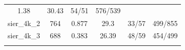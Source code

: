\documentclass[]{article}
\begin{document}
\begin{longtable}[]{@{}cccccc@{}}
\begin{minipage}[t]{0.11\columnwidth}
1.38\strut
\end{minipage} & \begin{minipage}[t]{0.13\columnwidth}\centering\strut
30.43\strut
\end{minipage} & \begin{minipage}[t]{0.18\columnwidth}\centering\strut
54/51\strut
\end{minipage} & \begin{minipage}[t]{0.22\columnwidth}\centering\strut
576/539\strut
\end{minipage}\tabularnewline
\begin{minipage}[t]{0.11\columnwidth}\centering\strut
sier\_4k\_2\strut
\end{minipage} & \begin{minipage}[t]{0.07\columnwidth}\centering\strut
764\strut
\end{minipage} & \begin{minipage}[t]{0.11\columnwidth}\centering\strut
0.877\strut
\end{minipage} & \begin{minipage}[t]{0.13\columnwidth}\centering\strut
29.3\strut
\end{minipage} & \begin{minipage}[t]{0.18\columnwidth}\centering\strut
33/57\strut
\end{minipage} & \begin{minipage}[t]{0.22\columnwidth}\centering\strut
499/855\strut
\end{minipage}\tabularnewline
\begin{minipage}[t]{0.11\columnwidth}\centering\strut
sier\_4k\_3\strut
\end{minipage} & \begin{minipage}[t]{0.07\columnwidth}\centering\strut
688\strut
\end{minipage} & \begin{minipage}[t]{0.11\columnwidth}\centering\strut
0.383\strut
\end{minipage} & \begin{minipage}[t]{0.13\columnwidth}\centering\strut
26.39\strut
\end{minipage} & \begin{minipage}[t]{0.18\columnwidth}\centering\strut
48/59\strut
\end{minipage} & \begin{minipage}[t]{0.22\columnwidth}\centering\strut
454/499\strut
\end{minipage}\tabularnewline
\begin{minipage}[t]{0.11\columnwidth}\centering\strut

\end{minipage}
\end{longtable}
\end{document}
